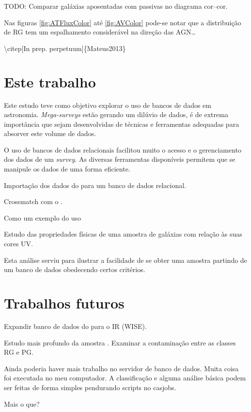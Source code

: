 TODO: Comparar galáxias aposentadas com passivas no diagrama cor--cor.

Nas figuras \ref{fig:ATFluxColor} até \ref{fig:AVColor} pode-se notar que a
distribuição de RG tem um espalhamento considerável na direção das AGN\ldots


\textbackslash citep{[In prep. perpetuum]}\{Mateus2013\}


\section{Este trabalho}

Este estudo teve como objetivo explorar o uso de bancos de dados em astronomia.
{\em Mega-surveys} estão gerando um dilúvio de dados, é de extrema importância
que sejam desenvolvidas de técnicas e ferramentas adequadas para absorver
este volume de dados.

O uso de bancos de dados relacionais facilitou muito o acesso e o gerenciamento
dos dados de um {\em survey}. As diversas ferramentas disponíveis permitem que
se manipule os dados de uma forma eficiente.

Importação dos dados do \starlight para um banco de dados relacional.

Crossmatch com o \galex.

Como um exemplo do uso

Estudo das propriedades físicas de uma amostra de galáxias com relação às suas
cores UV.


Esta análise serviu para ilustrar a facilidade de se obter uma amostra
partindo de um banco de dados obedecendo certos critérios.



\section{Trabalhos futuros}

Expandir banco de dados do \starlight para o IR (WISE).

Estudo mais profundo da amostra \starlightUV. Examinar a contaminação entre as
classes RG e PG.

Ainda poderia haver mais trabalho no servidor de banco de dados. Muita coisa foi
executada no meu computador. A classificação e alguma análise básica podem ser
feitas de forma simples pendurando scripts no casjobs.

Mais o que?


